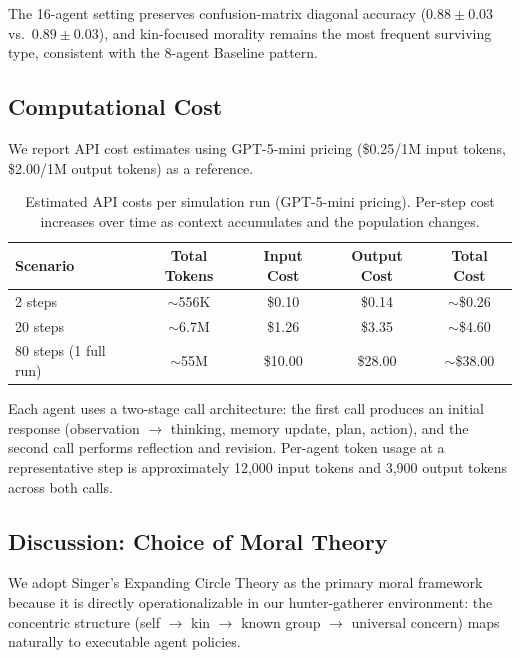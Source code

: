 The 16-agent setting preserves confusion-matrix diagonal accuracy ($0.88 \pm 0.03$ vs.\ $0.89 \pm 0.03$), and kin-focused morality remains the most frequent surviving type, consistent with the 8-agent Baseline pattern.

\subsection{Computational Cost}
\label{app:compute_cost}

We report API cost estimates using GPT-5-mini pricing (\$0.25/1M input tokens, \$2.00/1M output tokens) as a reference.

\begin{table}[H]
\centering
\small
\begin{tabular}{@{}lcccc@{}}
\toprule
\textbf{Scenario} & \textbf{Total Tokens} & \textbf{Input Cost} & \textbf{Output Cost} & \textbf{Total Cost} \\
\midrule
2 steps & $\sim$556K & \$0.10 & \$0.14 & $\sim$\$0.26 \\
20 steps & $\sim$6.7M & \$1.26 & \$3.35 & $\sim$\$4.60 \\
80 steps (1 full run) & $\sim$55M & \$10.00 & \$28.00 & $\sim$\$38.00 \\
\bottomrule
\end{tabular}
\caption{Estimated API costs per simulation run (GPT-5-mini pricing). Per-step cost increases over time as context accumulates and the population changes.}
\end{table}

Each agent uses a two-stage call architecture: the first call produces an initial response (observation $\rightarrow$ thinking, memory update, plan, action), and the second call performs reflection and revision. Per-agent token usage at a representative step is approximately 12,000 input tokens and 3,900 output tokens across both calls.

\subsection{Discussion: Choice of Moral Theory}
\label{app:moral_theory_choice}

We adopt Singer's Expanding Circle Theory as the primary moral framework because it is directly operationalizable in our hunter-gatherer environment: the concentric structure (self $\rightarrow$ kin $\rightarrow$ known group $\rightarrow$ universal concern) maps naturally to executable agent policies.

